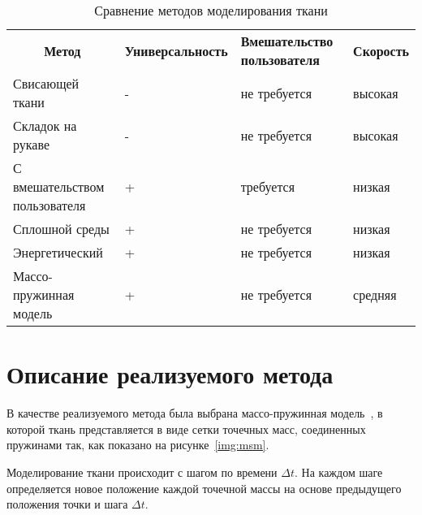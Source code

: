 \noindent
\begin{longtable}[Hc]{|p{4cm}|p{2cm}|p{4cm}|p{2cm}|}
\captionsetup{format=hang,justification=raggedright,
              singlelinecheck=off,width=16.3cm}
\caption{Сравнение методов моделирования ткани\label{tab:cloth}}\\
    \hline
    \multicolumn{1}{|c|}{\textbf{Метод}} &
    \multicolumn{1}{c|}{\textbf{Универсальность}} &
    \multicolumn{1}{p{4cm}|}{\textbf{Вмешательство пользователя}} &
    \multicolumn{1}{c|}{\textbf{Скорость}}\\
    \hline
    Свисающей ткани & - & не требуется & высокая \\
    \hline
    Складок на рукаве & - & не требуется & высокая \\
    \hline
    С вмешательством пользователя & + & требуется & низкая \\
    \hline
    Сплошной среды & + & не требуется & низкая \\
    \hline
    Энергетический & + & не требуется & низкая \\
    \hline
    Массо-пружинная модель & + & не требуется & средняя \\
    \hline
\end{longtable}

\section{Описание реализуемого метода}

В качестве реализуемого метода была выбрана массо-пружинная модель~\cite{bib14},
в которой ткань представляется в виде сетки точечных масс, соединенных пружинами
так, как показано на рисунке~\ref{img:msm}.


Моделирование ткани происходит с шагом по времени $\Delta t$. На каждом шаге
определяется новое положение каждой точечной массы на основе предыдущего
положения точки и шага $\Delta t$.

